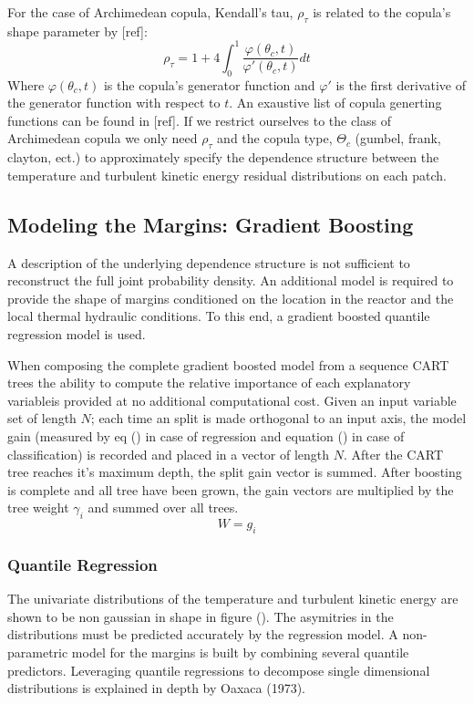 For the case of Archimedean copula, Kendall's tau, $\rho_\tau$ is
related to the copula's shape parameter by [ref]:
\begin{equation}
\rho_\tau = 1 + 4 \int_0^1 \frac{\varphi(\theta_c,t)}{\varphi'(\theta_c, t)}dt
\end{equation}
Where $\varphi(\theta_c, t)$ is the copula's generator function and $\varphi'$ is the first derivative of the generator function with respect to $t$.  An exaustive list of copula generting functions can be found in [ref].
If we restrict ourselves to the class of Archimedean copula we only need $\rho_\tau$ and the copula type, $\Theta_c$ (gumbel, frank, clayton, ect.) to approximately specify the dependence structure between the temperature and turbulent kinetic energy residual distributions on each patch.

\subsection{Modeling the Margins: Gradient Boosting}

A description of the underlying dependence structure is not sufficient to reconstruct the full joint probability density.  An additional model is required to provide the shape of margins conditioned on the location in the reactor and the local thermal hydraulic conditions.  To this end, a gradient boosted quantile regression model is used.

When composing the complete gradient boosted model from a sequence CART trees the ability to compute the relative importance of each explanatory variableis provided at no additional computational cost.  Given an input variable set of length $N$; each time an split is made orthogonal to an input axis, the model gain (measured by eq () in case of regression and equation () in case of classification) is recorded and placed in a vector of length $N$.  After the CART tree reaches it's maximum depth, the split gain vector is summed.  After boosting is complete and all tree have been grown, the gain vectors are multiplied by the tree weight $\gamma_i$ and summed over all trees.
\begin{equation}
W = g_i
\end{equation}

\subsubsection{Quantile Regression}

The univariate distributions of the temperature and turbulent kinetic energy are shown to be non gaussian in shape in figure ().  The asymitries in the distributions must be predicted accurately by the regression model.  A non-parametric model for the margins is built by combining several quantile predictors.  Leveraging quantile regressions to decompose single dimensional distributions is explained in depth by Oaxaca (1973).

